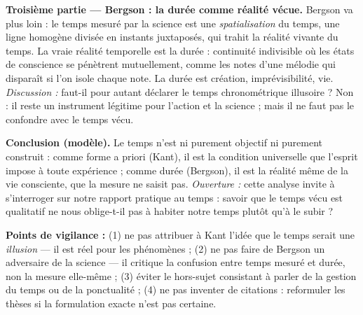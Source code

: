 \documentclass[11pt]{article}
\newcommand{\cle}[1]{{\popxbold\color{popdark}#1}}
\begin{document}
\begin{corrige}
\textbf{Troisième partie — Bergson : la durée comme réalité vécue.} Bergson va plus loin : le temps mesuré par la science est une \emph{spatialisation} du temps, une ligne homogène divisée en instants juxtaposés, qui trahit la réalité vivante du temps. La vraie réalité temporelle est la \cle{durée} : continuité indivisible où les états de conscience se pénètrent mutuellement, comme les notes d'une mélodie qui disparaît si l'on isole chaque note. La durée est création, imprévisibilité, vie. \emph{Discussion :} faut-il pour autant déclarer le temps chronométrique illusoire ? Non : il reste un instrument légitime pour l'action et la science ; mais il ne faut pas le confondre avec le temps vécu.

\textbf{Conclusion (modèle).} Le temps n'est ni purement objectif ni purement construit : comme forme a priori (Kant), il est la condition universelle que l'esprit impose à toute expérience ; comme durée (Bergson), il est la réalité même de la vie consciente, que la mesure ne saisit pas. \emph{Ouverture :} cette analyse invite à s'interroger sur notre rapport pratique au temps : savoir que le temps vécu est qualitatif ne nous oblige-t-il pas à habiter notre temps plutôt qu'à le subir ?

\textbf{Points de vigilance :} (1) ne pas attribuer à Kant l'idée que le temps serait une \emph{illusion} — il est réel pour les phénomènes ; (2) ne pas faire de Bergson un adversaire de la science — il critique la confusion entre temps mesuré et durée, non la mesure elle-même ; (3) éviter le hors-sujet consistant à parler de la gestion du temps ou de la ponctualité ; (4) ne pas inventer de citations : reformuler les thèses si la formulation exacte n'est pas certaine.
\end{corrige}
\end{document}
